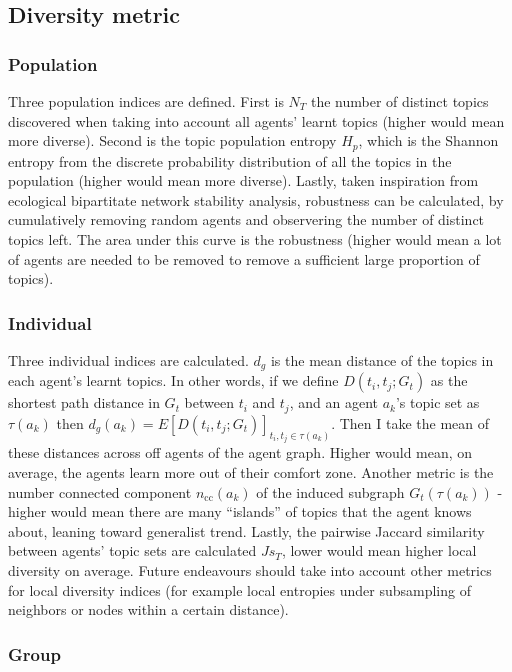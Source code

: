 \subsection{Diversity metric}

\subsubsection*{Population}

Three population indices are defined. First is $N_T$ the number of distinct topics discovered when taking into account all agents' learnt topics (higher would mean more diverse). Second is the topic population entropy $H_p$, which is the Shannon entropy from the discrete probability distribution of all the topics in the population (higher would mean more diverse). Lastly, taken inspiration from ecological bipartitate network stability analysis, robustness can be calculated, by cumulatively removing random agents and observering the number of distinct topics left. The area under this curve is the robustness (higher would mean a lot of agents are needed to be removed to remove a sufficient large proportion of topics).

\subsubsection*{Individual}

Three individual indices are calculated. $d_g$ is the mean distance of the topics in each agent's learnt topics. In other words, if we define $D(t_i,t_j;G_t)$ as the shortest path distance in $G_t$ between $t_i$ and $t_j$, and an agent $a_k$'s topic set as $\tau(a_k)$ then $d_g(a_k) = E\left[D(t_i,t_j;G_t)\right]_{t_i, t_j \in \tau(a_k)}$. Then I take the mean of these distances across off agents of the agent graph. Higher would mean, on average, the agents learn more out of their comfort zone. Another metric is the number connected component $n_{\mathrm{cc}}(a_k)$ of the induced subgraph $G_t(\tau(a_k))$ - higher would mean there are many ``islands'' of topics that the agent knows about, leaning toward generalist trend. Lastly, the pairwise Jaccard similarity between agents' topic sets are calculated $Js_T$, lower would mean higher local diversity on average. Future endeavours should take into account other metrics for local diversity indices (for example local entropies under subsampling of neighbors or nodes within a certain distance).

\subsubsection*{Group}

